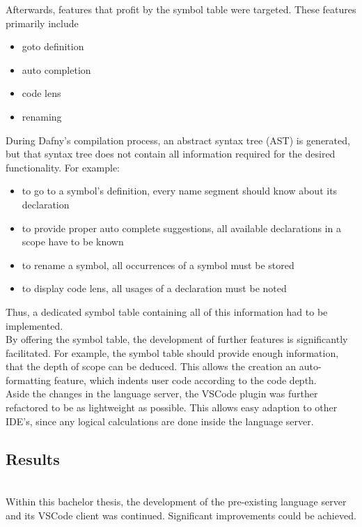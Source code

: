 Afterwards, features that profit by the symbol table were targeted.
These features primarily include
\begin{itemize}
    \item goto definition
    \item auto completion
    \item code lens
    \item renaming
\end{itemize}
During Dafny's compilation process, an abstract syntax tree (AST) is generated, but that syntax tree does not contain all information required for the desired functionality.
For example:
\begin{itemize}
    \item to go to a symbol's definition, every name segment should know about its declaration
    \item to provide proper auto complete suggestions, all available declarations in a scope have to be known
    \item to rename a symbol, all occurrences of a symbol must be stored
    \item to display code lens, all usages of a declaration must be noted
\end{itemize}
Thus, a dedicated symbol table containing all of this information had to be implemented.\\

By offering the symbol table, the development of further features is significantly facilitated.
For example, the symbol table should provide enough information, that the depth of scope can be deduced.
This allows the creation an auto-formatting feature, which indents user code according to the code depth.\\

Aside the changes in the language server, the VSCode plugin was further refactored to be as lightweight as possible.
This allows easy adaption to other IDE's, since any logical calculations are done inside the language server.




\subsection{Results}
\\

Within this bachelor thesis, the development of the pre-existing language server and its VSCode client was continued.
Significant improvements could be achieved.

